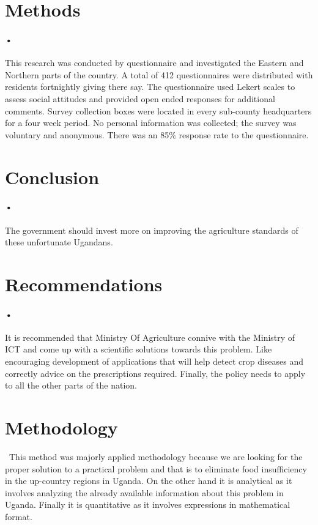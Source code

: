 \documentclass[12pt]{article}
\begin{document}
\section{Methods}
\paragraph{•}This research was conducted by questionnaire and investigated the Eastern and Northern parts of the country. A total of 412 questionnaires were distributed with residents fortnightly giving there say.
The questionnaire used Lekert scales to assess social attitudes and provided open ended responses for additional comments.
Survey collection boxes were located in every sub-county headquarters for a four week period. No
personal information was collected; the survey was voluntary and anonymous. There was an 85$\%$ response rate to the questionnaire.
\section{Conclusion}
\paragraph{•}The government should invest more on improving the agriculture standards of these unfortunate Ugandans.
\section{Recommendations}
\paragraph{•}It is recommended that Ministry Of Agriculture connive with the Ministry of ICT and come up with a scientific solutions towards this problem. Like encouraging development of applications that will help detect crop diseases and correctly advice on the prescriptions required.  
Finally, the policy needs to apply to all the other parts of the nation.
\section{Methodology}
\ This method was majorly applied methodology because we are looking for the proper solution to a practical problem and that is to eliminate food insufficiency in the up-country regions in Uganda.
On the other hand it is analytical as it involves analyzing the already available information about this problem in Uganda.
Finally it is quantitative as it involves expressions in mathematical format.   
 
\end{document}
